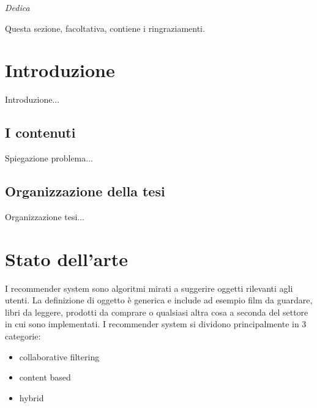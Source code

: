 \documentclass[12pt,italian]{report}
\begin{document}
\frontespizio
\beforepreface

% 
%

{\raggedleft \large \sl Dedica \\}
         
% 
%


%
%

Questa sezione, facoltativa, contiene i ringraziamenti.

%
%

\afterpreface

% 
% 

\chapter{Introduzione}
\label{cap:introduzione}

Introduzione...

\section{I contenuti}
\label{sec:contenuti}

Spiegazione problema...


\section{Organizzazione della tesi}
\label{sec:organizzazione}

Organizzazione tesi...

% 
% 



\chapter{Stato dell'arte}
\label{chap:stato_arte}
I recommender system sono algoritmi mirati a suggerire oggetti rilevanti agli utenti. La definizione di oggetto è generica e include ad esempio film da guardare, libri da leggere, prodotti da comprare o qualsiasi altra cosa a seconda del settore in cui sono implementati. 
I recommender system si dividono principalmente in 3 categorie:
\begin{itemize}
	\item collaborative filtering
	\item content based
	\item hybrid
\end{itemize}
\end{document}

